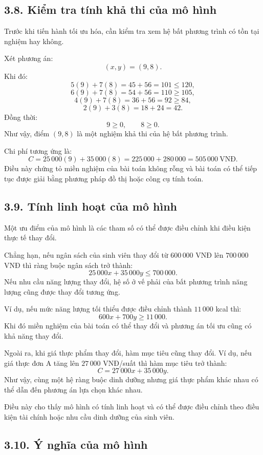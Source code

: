 \documentclass[12pt,a4paper]{article}
\begin{document}
\subsection*{3.8. Kiểm tra tính khả thi của mô hình}

Trước khi tiến hành tối ưu hóa, cần kiểm tra xem hệ bất phương trình có tồn tại nghiệm hay không.

Xét phương án:
\[
(x,y)=(9,8).
\]
Khi đó:
\[
5(9)+7(8)=45+56=101\leq120,
\]
\[
6(9)+7(8)=54+56=110\geq105,
\]
\[
4(9)+7(8)=36+56=92\geq84,
\]
\[
2(9)+3(8)=18+24=42.
\]
Đồng thời:
\[
9\geq0,\qquad8\geq0.
\]
Như vậy, điểm $(9,8)$ là một nghiệm khả thi của hệ bất phương trình.

Chi phí tương ứng là:
\[
C=25\,000(9)+35\,000(8)
=225\,000+280\,000
=505\,000\ \text{VNĐ}.
\]
Điều này chứng tỏ miền nghiệm của bài toán không rỗng và bài toán có thể tiếp tục được giải bằng phương pháp đồ thị hoặc công cụ tính toán.

\subsection*{3.9. Tính linh hoạt của mô hình}

Một ưu điểm của mô hình là các tham số có thể được điều chỉnh khi điều kiện thực tế thay đổi.

Chẳng hạn, nếu ngân sách của sinh viên thay đổi từ $600\,000$ VNĐ lên
$700\,000$ VNĐ thì ràng buộc ngân sách trở thành:
\[
25\,000x+35\,000y\leq700\,000.
\]
Nếu nhu cầu năng lượng thay đổi, hệ số ở vế phải của bất phương trình năng lượng cũng được thay đổi tương ứng.

Ví dụ, nếu mức năng lượng tối thiểu được điều chỉnh thành
$11\,000$ kcal thì:
\[
600x+700y\geq11\,000.
\]
Khi đó miền nghiệm của bài toán có thể thay đổi và phương án tối ưu cũng có khả năng thay đổi.

Ngoài ra, khi giá thực phẩm thay đổi, hàm mục tiêu cũng thay đổi. Ví dụ, nếu giá thực đơn A tăng lên $27\,000$ VNĐ/suất thì hàm mục tiêu trở thành:
\[
C=27\,000x+35\,000y.
\]
Như vậy, cùng một hệ ràng buộc dinh dưỡng nhưng giá thực phẩm khác nhau có thể dẫn đến phương án lựa chọn khác nhau.

Điều này cho thấy mô hình có tính linh hoạt và có thể được điều chỉnh theo điều kiện tài chính hoặc nhu cầu dinh dưỡng của sinh viên.

\subsection*{3.10. Ý nghĩa của mô hình}
\end{document}
